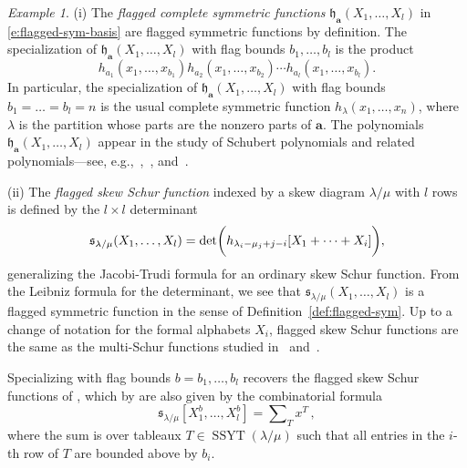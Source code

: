 \documentclass[12pt]{amsart}
\theoremstyle{definition}
\theoremstyle{remark}
\newtheorem{example}[thm]{Example}
\newcommand{\aA}{{\mathbf a}}
\newcommand{\fh}{{\mathfrak h}}
\newcommand{\sfrak}{{\mathfrak s}}
\DeclareMathOperator{\SSYT}{SSYT}
\begin{document}
\begin{example}\label{ex:flagged-sym-1}
(i) The {\em flagged complete symmetric functions} ${\fh}_{\aA
}(X_{1},\ldots,X_{l})$ in \eqref{e:flagged-sym-basis} are flagged
symmetric functions by definition.  The specialization of ${\fh}_{\aA
}(X_{1},\ldots,X_{l})$ with flag bounds $b_{1},\ldots,b_{l}$ is the
product
\begin{equation}\label{e:flagged-h-special}
h_{a_{1}}(x_{1},\ldots,x_{b_{1}}) h_{a_{2}}(x_{1},\ldots,x_{b_{2}})  \cdots
h_{a_{l}}(x_{1},\ldots,x_{b_{l}}).
\end{equation}
In particular, the specialization of ${\fh}_{\aA
}(X_{1},\ldots,X_{l})$ with flag bounds $b_{1} = \ldots = b_{l} = n$
is the usual complete symmetric function $h_{\lambda
}(x_{1},\ldots,x_{n})$, where $\lambda $ is the partition whose parts
are the nonzero parts of $\aA $.  The polynomials ${\fh}_{\aA
}(X_{1},\ldots,X_{l})$ appear in the study of Schubert polynomials and
related polynomials---see, e.g.,~\cite[\S
11]{FomGelPos97},~\cite{LascouxNaruse14}, and~\cite[Chapter
III]{Macdonald91}.

(ii)
The {\em flagged skew Schur function} indexed by a skew diagram
$\lambda /\mu $ with $l$ rows is defined by the $l\times l$
determinant
\begin{equation}\label{e:flagged-skew-schur}
\sfrak _{\lambda /\mu }(X_{1},\ldots,X_{l}) = \det \biggl(
h_{\lambda _{i}-\mu _{j}+j-i}[X_{1}+\cdots +X_{i}]\\
\biggr),
\end{equation}
generalizing the Jacobi-Trudi formula for an ordinary skew Schur
function.  From the Leibniz formula for the determinant, we see that
${\mathfrak s}_{\lambda /\mu }(X_{1},\ldots,X_{l})$ is a flagged
symmetric function in the sense of Definition~\ref{def:flagged-sym}.
Up to a change of notation for the formal alphabets $X_{i}$, flagged
skew Schur functions are the same as the multi-Schur functions studied
in~\cite{LascouxNaruse14} and~\cite[eq.~(3.1)]{Macdonald91}.

Specializing with flag bounds $b = b_{1},\ldots,b_{l}$ recovers the
flagged skew Schur functions of \cite{LascouxSchutz82}, which by
\cite{GessVien89, Wachs} are also given by the
combinatorial formula
\begin{equation}
\label{eq:flagschuridentity} \sfrak_{\lambda /\mu
}[X_1^b,\ldots,X_l^b] = \sum \nolimits _{T} x^{T}\, ,
\end{equation}
where the sum is over tableaux $T\in \SSYT(\lambda /\mu )$ such that
all entries in the $i$-th row of $T$ are bounded above by $b_{i}$.
\end{example}
\end{document}
